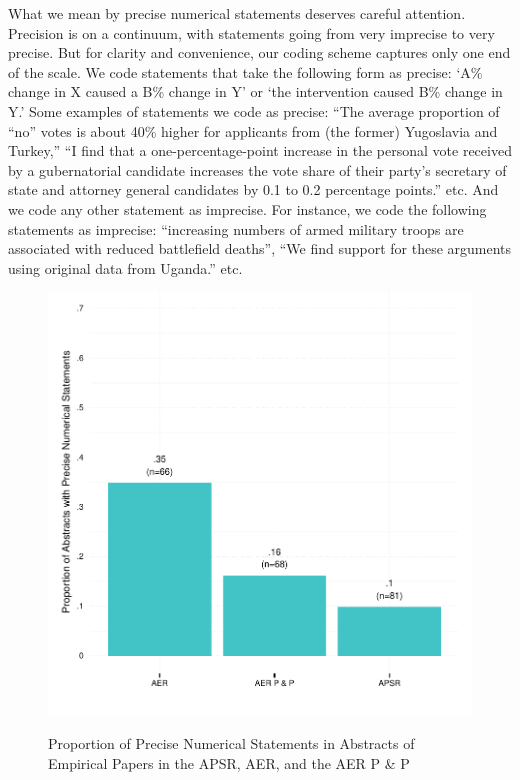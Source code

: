 \documentclass[12pt]{article}
\begin{document}
What we mean by precise numerical statements deserves careful attention. Precision is on a continuum, with statements going from very imprecise to very precise. But for clarity and convenience, our coding scheme captures only one end of the scale. We code statements that take the following form as precise: `A\% change in X caused a B\% change in Y' or `the intervention caused B\% change in Y.' Some examples of statements we code as precise: ``The average proportion of ``no'' votes is about 40\% higher for applicants from (the former) Yugoslavia and Turkey,'' ``I find that a one-percentage-point increase in the personal vote received by a gubernatorial candidate increases the vote share of their party's secretary of state and attorney general candidates by 0.1 to 0.2 percentage points.'' etc. And we code any other statement as imprecise. For instance, we code the following statements as imprecise: ``increasing numbers of armed military troops are associated with reduced battlefield deaths'', ``We find support for these arguments using original data from Uganda.'' etc. 

\begin{figure}[htbp]
\centering
\caption{Proportion of Precise Numerical Statements in Abstracts of Empirical Papers in the APSR, AER, and the AER P \& P}
\includegraphics[scale=.75]{../figs/apsr_aer.pdf}
\label{fig:summary}
\end{figure}
\end{document}
